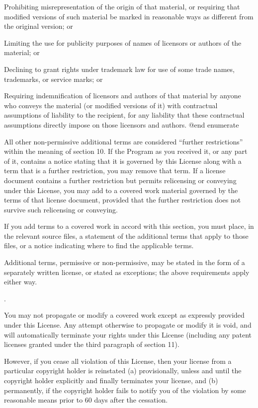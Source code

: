 \item
Prohibiting misrepresentation of the origin of that material, or
requiring that modified versions of such material be marked in
reasonable ways as different from the original version; or

\item
Limiting the use for publicity purposes of names of licensors or
authors of the material; or

\item
Declining to grant rights under trademark law for use of some trade
names, trademarks, or service marks; or

\item
Requiring indemnification of licensors and authors of that material by
anyone who conveys the material (or modified versions of it) with
contractual assumptions of liability to the recipient, for any
liability that these contractual assumptions directly impose on those
licensors and authors.
@end enumerate

All other non-permissive additional terms are considered ``further
restrictions'' within the meaning of section 10.  If the Program as you
received it, or any part of it, contains a notice stating that it is
governed by this License along with a term that is a further
restriction, you may remove that term.  If a license document contains
a further restriction but permits relicensing or conveying under this
License, you may add to a covered work material governed by the terms
of that license document, provided that the further restriction does
not survive such relicensing or conveying.

If you add terms to a covered work in accord with this section, you
must place, in the relevant source files, a statement of the
additional terms that apply to those files, or a notice indicating
where to find the applicable terms.

Additional terms, permissive or non-permissive, may be stated in the
form of a separately written license, or stated as exceptions; the
above requirements apply either way.

\itemTermination.

You may not propagate or modify a covered work except as expressly
provided under this License.  Any attempt otherwise to propagate or
modify it is void, and will automatically terminate your rights under
this License (including any patent licenses granted under the third
paragraph of section 11).

However, if you cease all violation of this License, then your license
from a particular copyright holder is reinstated (a) provisionally,
unless and until the copyright holder explicitly and finally
terminates your license, and (b) permanently, if the copyright holder
fails to notify you of the violation by some reasonable means prior to
60 days after the cessation.


